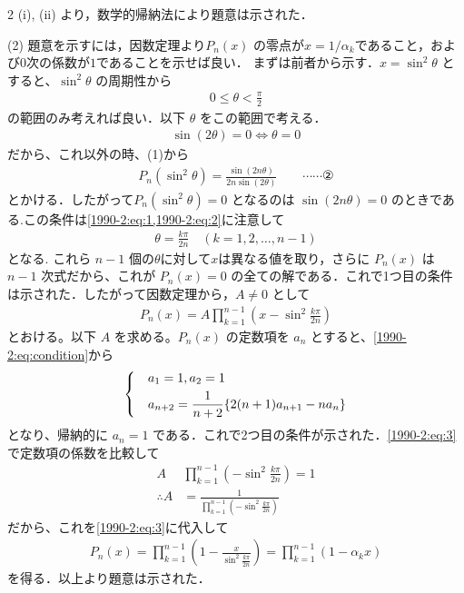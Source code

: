 \documentclass[../../main.tex]{subfiles}
\begin{document}
\begin{multicols}{2}
  (i), (ii) より，数学的帰納法により題意は示された．

  \vspace{10pt}
  (2) 題意を示すには，因数定理より$P_n(x)$ の零点が$x=1/\alpha_{k}$であること，および$0$次の係数が$1$であることを示せば良い．
  まずは前者から示す．$x=\sin^2\theta$ とすると、$\sin^2\theta$ の周期性から
  \begin{align}\label{1990-2:eq:1}
    0 \le \theta < \frac{\pi}{2}
  \end{align}
  の範囲のみ考えれば良い．以下 $\theta$ をこの範囲で考える．
  \begin{align}\label{1990-2:eq:2}
    \sin(2\theta) = 0 \Leftrightarrow \theta = 0
  \end{align}
  だから、これ以外の時、(1)から
  \begin{align*}
    P_n(\sin^2\theta) = \frac{\sin(2n\theta)}{2n\sin(2\theta)} \qquad \cdots\cdots ②
  \end{align*}
  とかける．したがって$P_n(\sin^2\theta)=0$ となるのは $\sin(2n\theta)=0$ のときである.この条件は\cref{1990-2:eq:1,1990-2:eq:2}に注意して
  \begin{align*}
    \theta = \frac{k\pi}{2n} \quad (k=1, 2, \dots, n-1)
  \end{align*}
  となる. これら $n-1$ 個の$\theta$に対して$x$は異なる値を取り，さらに $P_n(x)$ は $n-1$ 次式だから、これが $P_n(x)=0$ の全ての解である．これで1つ目の条件は示された．したがって因数定理から，$A\ne 0$ として
  \begin{align}\label{1990-2:eq:3}
    P_n(x) = A \prod_{k=1}^{n-1} \left(x - \sin^2\frac{k\pi}{2n}\right)
  \end{align}
  とおける。以下 $A$ を求める。$P_n(x)$ の定数項を $a_n$ とすると、\cref{1990-2:eq:condition}から
  \begin{align}
    \begin{dcases}
       & a_1=1, a_2=1                                    \\
       & a_{n+2} = \frac{1}{n+2}\{2(n+1)a_{n+1} - na_n\}
    \end{dcases}
  \end{align}
  となり、帰納的に $a_n=1$ である．これで2つ目の条件が示された．\cref{1990-2:eq:3}で定数項の係数を比較して
  \begin{align*}
    A            & \prod_{k=1}^{n-1} \left(-\sin^2\frac{k\pi}{2n}\right) = 1         \\
    \therefore A & = \frac{1}{\prod_{k=1}^{n-1} \left(-\sin^2\frac{k\pi}{2n}\right)}
  \end{align*}
  だから、これを\cref{1990-2:eq:3}に代入して
  \begin{align}
    P_n(x) = \prod_{k=1}^{n-1} \left(1 - \frac{x}{\sin^2\frac{k\pi}{2n}}\right) = \prod_{k=1}^{n-1} (1-\alpha_k x)
  \end{align}
  を得る．以上より題意は示された．


\end{multicols}
\end{document}
